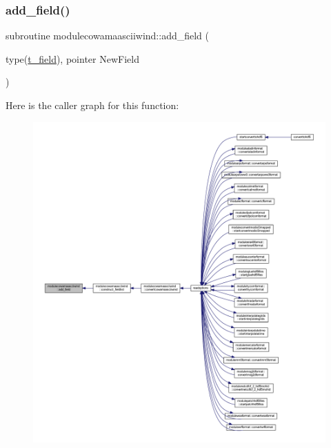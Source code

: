\subsubsection{\texorpdfstring{add\+\_\+field()}{add\_field()}}
{\footnotesize\ttfamily subroutine modulecowamaasciiwind\+::add\+\_\+field (\begin{DoxyParamCaption}\item[{type(\mbox{\hyperlink{structmodulecowamaasciiwind_1_1t__field}{t\+\_\+field}}), pointer}]{New\+Field }\end{DoxyParamCaption})\hspace{0.3cm}{\ttfamily [private]}}

Here is the caller graph for this function\+:\nopagebreak
\begin{figure}[H]
\begin{center}
\leavevmode
\includegraphics[width=350pt]{namespacemodulecowamaasciiwind_ac11c8ada96001555421156bb05d44db1_icgraph}
\end{center}
\end{figure}
\mbox{\label{namespacemodulecowamaasciiwind_a340e2d839a8a04ceb31a4beae499e21a}} 
